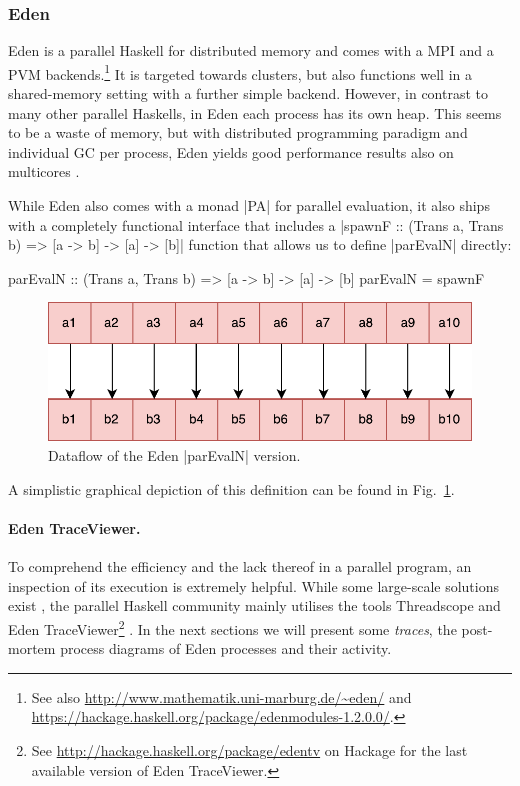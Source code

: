 \subsubsection{Eden}
Eden \cite{eden,Loogen2012} is a parallel Haskell for distributed memory and comes with a MPI and a PVM backends.\footnote{See also \url{http://www.mathematik.uni-marburg.de/~eden/} and \url{https://hackage.haskell.org/package/edenmodules-1.2.0.0/}.} It is targeted towards clusters, but also functions well in a shared-memory setting with a further simple backend. However, in contrast to many other parallel Haskells, in Eden each process has its own heap. This seems to be a waste of memory, but with distributed programming paradigm and individual GC per process, Eden yields good performance results also on multicores \cite{arcs-dc,aswad2009low}.

While Eden also comes with a monad |PA| for parallel evaluation, it also ships with a completely functional interface that includes
a |spawnF :: (Trans a, Trans b) => [a -> b] -> [a] -> [b]|
function that
allows us to define |parEvalN| directly:

\begin{code}
parEvalN :: (Trans a, Trans b) => [a -> b] -> [a] -> [b]
parEvalN = spawnF 
\end{code}
\begin{figure}[h]
	\includegraphics[scale=0.5]{images/parEvalNEden}
	\caption{Dataflow of the Eden |parEvalN| version.}
	\label{fig:parEvalNEden}
\end{figure}
A simplistic graphical depiction of this definition can be found in Fig.~\ref{fig:parEvalNEden}.

\paragraph{Eden TraceViewer.}
\label{sec:edentv}
To comprehend the efficiency and the lack thereof in a parallel program, an inspection of its execution is extremely helpful. While some large-scale solutions exist \cite{Geimer2010}, the parallel Haskell community mainly utilises the tools Threadscope \cite{Wheeler2009} and Eden TraceViewer\footnote{See \url{http://hackage.haskell.org/package/edentv} on Hackage for the last available version of Eden TraceViewer.} \cite{Berthold2007a}. In the next sections we will present some \emph{traces}, the post-mortem process diagrams of Eden processes and their activity.

